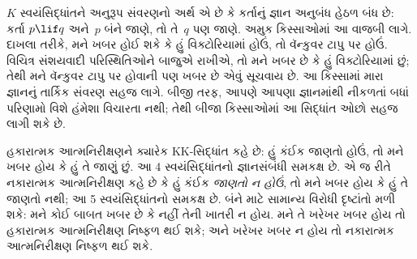 \documentclass[../../../include/open-logic-section]{subfiles}
\begin{document}
$K$ સ્વયંસિદ્ધાંતને અનુરૂપ સંવરણનો અર્થ એ છે કે કર્તાનું જ્ઞાન
અનુબંધ હેઠળ બંધ છે: કર્તા $p\lif q$ અને~$p$ બંને જાણે, તો
તે~$q$ પણ જાણે. અમુક કિસ્સાઓમાં આ વાજબી લાગે. દાખલા
તરીકે, મને ખબર હોઈ શકે કે હું વિક્ટોરિયામાં હોઉં, તો વૅન્કુવર
ટાપુ પર હોઉં. વિચિત્ર સંશયવાદી પરિસ્થિતિઓને બાજુએ રાખીએ, તો
મને ખબર છે કે હું વિક્ટોરિયામાં છું; તેથી મને વૅન્કુવર ટાપુ
પર હોવાની પણ ખબર છે એવું સૂચવાય છે. આ કિસ્સામાં મારા જ્ઞાનનું
તાર્કિક સંવરણ સહજ લાગે. બીજી તરફ, આપણે આપણા જ્ઞાનમાંથી નીકળતાં
બધાં પરિણામો વિશે હંમેશા વિચારતા નથી; તેથી બીજા કિસ્સાઓમાં
આ સિદ્ધાંત ઓછો સહજ લાગી શકે છે.

હકારાત્મક આત્મનિરીક્ષણને ક્યારેક KK-સિદ્ધાંત કહે છે: હું કંઈક
જાણતો હોઉં, તો મને ખબર હોય કે હું તે જાણું છું. આ 4
સ્વયંસિદ્ધાંતનો જ્ઞાનસંબંધી સમકક્ષ છે. એ જ રીતે નકારાત્મક
આત્મનિરીક્ષણ કહે છે કે હું કંઈક \emph{જાણતો ન હોઉં}, તો મને
ખબર હોય કે હું તે જાણતો નથી; આ 5 સ્વયંસિદ્ધાંતનો સમકક્ષ છે.
બંને માટે સામાન્ય વિરોધી દૃષ્ટાંતો મળી શકે: મને કોઈ બાબત ખબર
છે કે નહીં તેની ખાતરી ન હોય. મને તે ખરેખર ખબર હોય તો હકારાત્મક
આત્મનિરીક્ષણ નિષ્ફળ થઈ શકે; અને ખરેખર ખબર ન હોય તો નકારાત્મક
આત્મનિરીક્ષણ નિષ્ફળ થઈ શકે.
\end{document}
